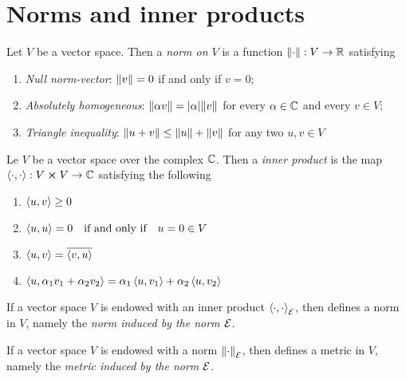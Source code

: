 \documentclass[oneside, 10pt, notitlepage]{book}
\begin{document}
\section{Norms and inner products}

\begin{definition}[Norm]
	Let \(V\) be a vector space. Then a \emph{norm on \(V\)} is a function \(\norm{\cdot}:V\to \mathbb{R}\) satisfying
	\begin{enumerate}
		\item \emph{Null norm-vector}: \(\norm{v} = 0\) if and only if \(v=0\);
		\item \emph{Absolutely homogeneous}: \(\norm{\alpha v} = \abs{\alpha}\norm{v}\) for every \(\alpha \in \mathbb{C}\) and every \(v\in V\);
		\item \emph{Triangle inequality}: \(\norm{u+v} \leq \norm{u}+\norm{v}\) for any two \(u,v\in V\)
	\end{enumerate}
\end{definition}

\begin{definition}
	Le \(V\) be a vector space over the complex \(\mathbb{C}\). Then a \emph{inner product} is the map \(\left\langle \cdot,\cdot \right\rangle: V\cross V \to \mathbb{C}\) satisfying the following
	\begin{enumerate}
		\item \(\left\langle u,v \right\rangle\geq 0\)
		\item \(\inner{u}{u}=0 \qq{if and only if} u = 0 \in V\)
		\item \(\left\langle u,v \right\rangle = \overline{\left\langle v,u \right\rangle}\)
		\item \(\left\langle u,\alpha_1 v_1 + \alpha_2 v_2 \right\rangle = \alpha_1 \left\langle u,v_1 \right\rangle + \alpha_2 \left\langle u,v_2 \right\rangle\)
	\end{enumerate}
\end{definition}

\begin{corollary}
	If a vector space \(V\) is endowed with an inner product \(\left\langle \cdot,\cdot \right\rangle_{\mathcal{E}}\), then
	defines a norm in \(V\), namely the \emph{norm induced by the norm \(\mathcal{E}\)}.
\end{corollary}

\begin{corollary}
	If a vector space \(V\) is endowed with a norm \(\norm{\cdot}_{\mathcal{E}}\), then
	defines a metric in \(V\), namely the \emph{metric induced by the norm \(\mathcal{E}\)}.
\end{corollary}
\end{document}
